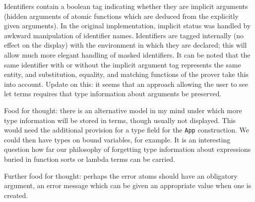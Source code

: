 \documentclass[12pt]{article}
\begin{document}
Identifiers contain a boolean tag indicating whether they are implicit arguments (hidden arguments of atomic functions which are deduced from the explicitly given arguments).  In the original implementation, implicit status was handled by awkward manipulation of identifier names.  Identifiers are tagged internally (no effect on the display) with the environment in which they are declared;  this will allow much more elegant handling of masked identifiers.   It can be noted that the same identifier with or without the implicit argument tag represents the same entity, and substitution, equality, and matching functions of the prover take this into account.  Update on this:  it seems that an approach allowing the user to see let terms requires that type information about arguments be preserved.

Food for thought:  there is an alternative model in my mind under which more type information will be stored in terms, though usually not displayed.
This would need the additional provision for a type field for the {\tt App} construction.  We could then have types on bound variables, for example.  It is an interesting
question how far our philosophy of forgetting type information about expressions buried in function sorts or lambda terms can be carried.

Further food for thought: perhaps the error atoms should have an obligatory argument, an error message which can be given an appropriate value when one is created.
\end{document}
